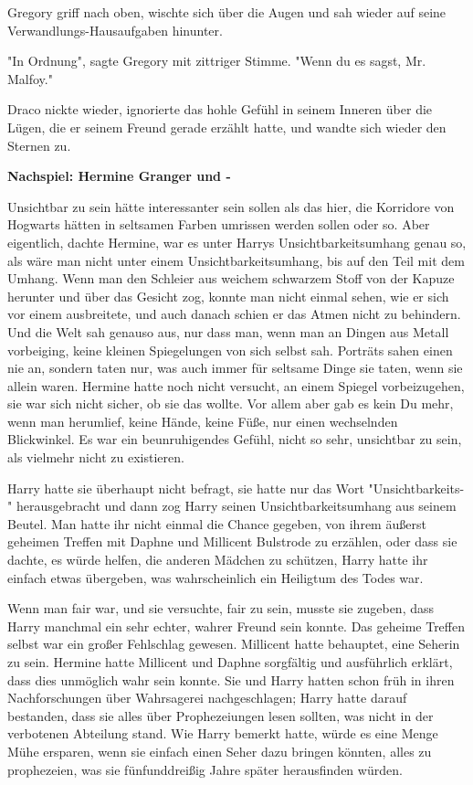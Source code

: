 {Gregory griff nach oben, wischte sich über die Augen und sah wieder auf seine Verwandlungs-Hausaufgaben hinunter.

"In Ordnung", sagte Gregory mit zittriger Stimme. "Wenn du es sagst, Mr. Malfoy."

Draco nickte wieder, ignorierte das hohle Gefühl in seinem Inneren über die Lügen, die er seinem Freund gerade erzählt hatte, und wandte sich wieder den Sternen zu.

\textbf{Nachspiel: Hermine Granger und -}

Unsichtbar zu sein hätte interessanter sein sollen als das hier, die Korridore von Hogwarts hätten in seltsamen Farben umrissen werden sollen oder so. Aber eigentlich, dachte Hermine, war es unter Harrys Unsichtbarkeitsumhang genau so, als wäre man nicht unter einem Unsichtbarkeitsumhang, bis auf den Teil mit dem Umhang. Wenn man den Schleier aus weichem schwarzem Stoff von der Kapuze herunter und über das Gesicht zog, konnte man nicht einmal sehen, wie er sich vor einem ausbreitete, und auch danach schien er das Atmen nicht zu behindern. Und die Welt sah genauso aus, nur dass man, wenn man an Dingen aus Metall vorbeiging, keine kleinen Spiegelungen von sich selbst sah. Porträts sahen einen nie an, sondern taten nur, was auch immer für seltsame Dinge sie taten, wenn sie allein waren. Hermine hatte noch nicht versucht, an einem Spiegel vorbeizugehen, sie war sich nicht sicher, ob sie das wollte. Vor allem aber gab es kein Du mehr, wenn man herumlief, keine Hände, keine Füße, nur einen wechselnden Blickwinkel. Es war ein beunruhigendes Gefühl, nicht so sehr, unsichtbar zu sein, als vielmehr nicht zu existieren.

Harry hatte sie überhaupt nicht befragt, sie hatte nur das Wort "Unsichtbarkeits-" herausgebracht und dann zog Harry seinen Unsichtbarkeitsumhang aus seinem Beutel. Man hatte ihr nicht einmal die Chance gegeben, von ihrem äußerst geheimen Treffen mit Daphne und Millicent Bulstrode zu erzählen, oder dass sie dachte, es würde helfen, die anderen Mädchen zu schützen, Harry hatte ihr einfach etwas übergeben, was wahrscheinlich ein Heiligtum des Todes war.

Wenn man fair war, und sie versuchte, fair zu sein, musste sie zugeben, dass Harry manchmal ein sehr echter, wahrer Freund sein konnte. Das geheime Treffen selbst war ein großer Fehlschlag gewesen. Millicent hatte behauptet, eine Seherin zu sein. Hermine hatte Millicent und Daphne sorgfältig und ausführlich erklärt, dass dies unmöglich wahr sein konnte. Sie und Harry hatten schon früh in ihren Nachforschungen über Wahrsagerei nachgeschlagen; Harry hatte darauf bestanden, dass sie alles über Prophezeiungen lesen sollten, was nicht in der verbotenen Abteilung stand. Wie Harry bemerkt hatte, würde es eine Menge Mühe ersparen, wenn sie einfach einen Seher dazu bringen könnten, alles zu prophezeien, was sie fünfunddreißig Jahre später herausfinden würden.

}
